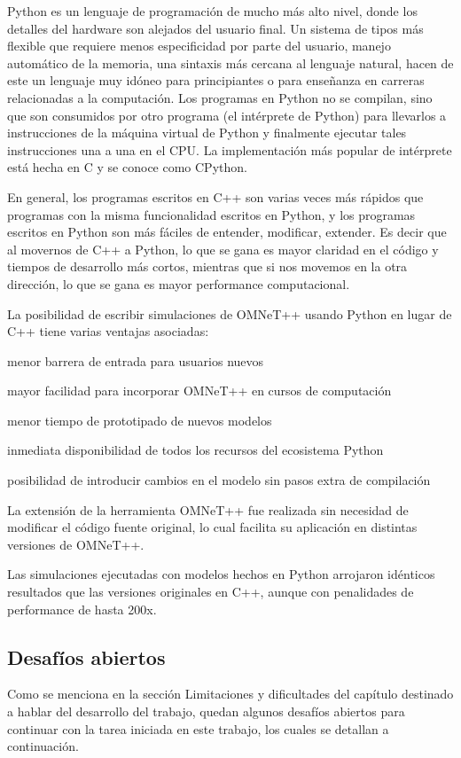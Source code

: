 \documentclass[]{article}
\begin{document}
Python es un lenguaje de programación de mucho más alto nivel, donde los
detalles del hardware son alejados del usuario final. Un sistema de tipos más
flexible que requiere menos especificidad por parte del usuario, manejo
automático de la memoria, una sintaxis más cercana al lenguaje natural, hacen
de este un lenguaje muy idóneo para principiantes o para enseñanza en carreras
relacionadas a la computación. Los programas en Python no se compilan, sino que
son consumidos por otro programa (el intérprete de Python) para llevarlos a
instrucciones de la máquina virtual de Python y finalmente ejecutar tales
instrucciones una a una en el CPU. La implementación más popular de intérprete
está hecha en C y se conoce como CPython.

En general, los programas escritos en C++ son varias veces más rápidos que
programas con la misma funcionalidad escritos en Python, y los programas
escritos en Python son más fáciles de entender, modificar, extender. Es decir
que al movernos de C++ a Python, lo que se gana es mayor claridad en el código
y tiempos de desarrollo más cortos, mientras que si nos movemos en la otra
dirección, lo que se gana es mayor performance computacional.

La posibilidad de escribir simulaciones de OMNeT++ usando Python en lugar de
C++ tiene varias ventajas asociadas:

menor barrera de entrada para usuarios nuevos

mayor facilidad para incorporar OMNeT++ en cursos de computación

menor tiempo de prototipado de nuevos modelos

inmediata disponibilidad de todos los recursos del ecosistema Python

posibilidad de introducir cambios en el modelo sin pasos extra de compilación

La extensión de la herramienta OMNeT++ fue realizada sin necesidad de modificar
el código fuente original, lo cual facilita su aplicación en distintas
versiones de OMNeT++.

Las simulaciones ejecutadas con modelos hechos en Python arrojaron idénticos
resultados que las versiones originales en C++, aunque con penalidades de
performance de hasta 200x.

\subsection{Desafíos abiertos}

Como se menciona en la sección Limitaciones y dificultades del capítulo
destinado a hablar del desarrollo del trabajo, quedan algunos desafíos abiertos
para continuar con la tarea iniciada en este trabajo, los cuales se detallan a
continuación.
\end{document}
